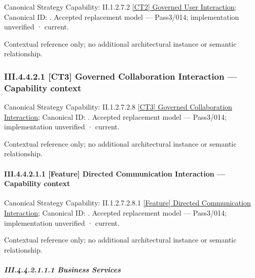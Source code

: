 {\small Canonical Strategy Capability: II.1.2.7.2 \hyperref[element:14c8b1a5515b4d3d9ac976594a4d00d8]{[CT2] Governed User Interaction}; Canonical ID: \texttt{}. Accepted replacement model — Pass3/014; implementation unverified · current.}\par
Contextual reference only; no additional architectural instance or semantic relationship.\par
\subsubsection*{III.4.4.2.1 [CT3] Governed Collaboration Interaction — Capability context}
\label{navigation:III.4.4.2.1}

{\small Canonical Strategy Capability: II.1.2.7.2.8 \hyperref[element:0f037de6d225499f9ab962a12f255d87]{[CT3] Governed Collaboration Interaction}; Canonical ID: \texttt{}. Accepted replacement model — Pass3/014; implementation unverified · current.}\par
Contextual reference only; no additional architectural instance or semantic relationship.\par
\paragraph*{III.4.4.2.1.1 [Feature] Directed Communication Interaction — Capability context}
\label{navigation:III.4.4.2.1.1}

{\small Canonical Strategy Capability: II.1.2.7.2.8.1 \hyperref[element:00b421624b6245bd9b36d35327b3ac25]{[Feature] Directed Communication Interaction}; Canonical ID: \texttt{}. Accepted replacement model — Pass3/014; implementation unverified · current.}\par
Contextual reference only; no additional architectural instance or semantic relationship.\par
\subparagraph*{III.4.4.2.1.1.1 Business Services}
\label{navigation:III.4.4.2.1.1.1}

\label{navigation:III.4.4.2.1.1.1.1}

